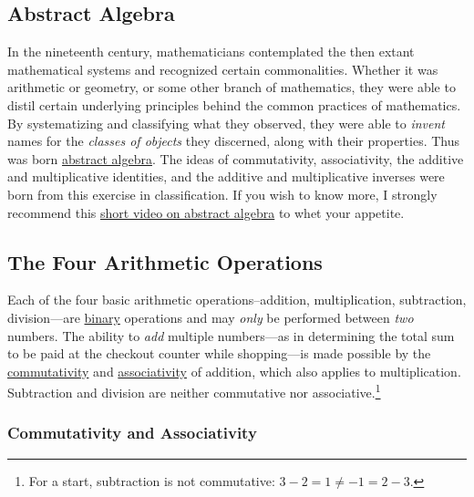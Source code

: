 \documentclass[
  a4paper,
]{article}
\begin{document}
\hypertarget{abstract-algebra}{%
\subsection{Abstract Algebra}\label{abstract-algebra}}

In the nineteenth century, mathematicians contemplated the then extant
mathematical systems and recognized certain commonalities. Whether it
was arithmetic or geometry, or some other branch of mathematics, they
were able to distil certain underlying principles behind the common
practices of mathematics. By systematizing and classifying what they
observed, they were able to \emph{invent} names for the \emph{classes of
objects} they discerned, along with their properties. Thus was born
\href{https://en.wikipedia.org/wiki/Abstract_algebra}{abstract algebra}.
The ideas of commutativity, associativity, the additive and
multiplicative identities, and the additive and multiplicative inverses
were born from this exercise in classification. If you wish to know
more, I strongly recommend this
\href{https://www.youtube.com/watch?v=IP7nW_hKB7I}{short video on
abstract algebra} to whet your appetite.

\hypertarget{the-four-arithmetic-operations}{%
\subsection{The Four Arithmetic
Operations}\label{the-four-arithmetic-operations}}

Each of the four basic arithmetic operations--addition, multiplication,
subtraction, division---are
\href{https://en.wikipedia.org/w/index.php?title=Binary_operation\&oldid=1182322931}{binary}
operations and may \emph{only} be performed between \emph{two} numbers.
The ability to \emph{add} multiple numbers---as in determining the total
sum to be paid at the checkout counter while shopping---is made possible
by the
\href{https://en.wikipedia.org/wiki/Commutative_property}{commutativity}
and
\href{https://en.wikipedia.org/wiki/Associative_property}{associativity}
of addition, which also applies to multiplication. Subtraction and
division are neither commutative nor associative.\footnote{For a start,
  subtraction is not commutative: \(3 - 2 = 1 \ne -1 = 2 - 3\).}

\hypertarget{commutativity-and-associativity}{%
\subsubsection{Commutativity and
Associativity}\label{commutativity-and-associativity}}
\end{document}
